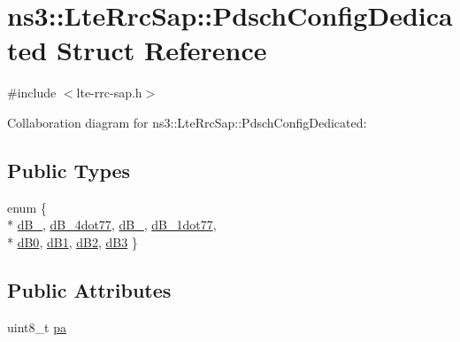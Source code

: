 \hypertarget{structns3_1_1LteRrcSap_1_1PdschConfigDedicated}{}\section{ns3\+:\+:Lte\+Rrc\+Sap\+:\+:Pdsch\+Config\+Dedicated Struct Reference}
\label{structns3_1_1LteRrcSap_1_1PdschConfigDedicated}


{\ttfamily \#include $<$lte-\/rrc-\/sap.\+h$>$}



Collaboration diagram for ns3\+:\+:Lte\+Rrc\+Sap\+:\+:Pdsch\+Config\+Dedicated\+:
\subsection*{Public Types}
\begin{DoxyCompactItemize}
\item 
enum \{ \\*
\hyperlink{structns3_1_1LteRrcSap_1_1PdschConfigDedicated_ab578fcb68059ff534058eb5c67df7168a42399258b8b913f0a56c4e950354cbe3}{d\+B\+\_}, 
\hyperlink{structns3_1_1LteRrcSap_1_1PdschConfigDedicated_ab578fcb68059ff534058eb5c67df7168ad1abcb4b289e226650368e4f93fe1fc8}{d\+B\+\_\+4dot77}, 
\hyperlink{structns3_1_1LteRrcSap_1_1PdschConfigDedicated_ab578fcb68059ff534058eb5c67df7168ad063207223326a9486eba1ce016865d9}{d\+B\+\_}, 
\hyperlink{structns3_1_1LteRrcSap_1_1PdschConfigDedicated_ab578fcb68059ff534058eb5c67df7168a02259942327b99c5664d644aa58232a8}{d\+B\+\_\+1dot77}, 
\\*
\hyperlink{structns3_1_1LteRrcSap_1_1PdschConfigDedicated_ab578fcb68059ff534058eb5c67df7168ab2c88638c7d33e466151e88100a930d6}{d\+B0}, 
\hyperlink{structns3_1_1LteRrcSap_1_1PdschConfigDedicated_ab578fcb68059ff534058eb5c67df7168aa673d34261604d2117b2980842ca4cf4}{d\+B1}, 
\hyperlink{structns3_1_1LteRrcSap_1_1PdschConfigDedicated_ab578fcb68059ff534058eb5c67df7168abb102a537d21d1ba559d2eab80edc657}{d\+B2}, 
\hyperlink{structns3_1_1LteRrcSap_1_1PdschConfigDedicated_ab578fcb68059ff534058eb5c67df7168a72e02fab5b3134438e44150e2cf24c6e}{d\+B3}
 \}
\end{DoxyCompactItemize}
\subsection*{Public Attributes}
\begin{DoxyCompactItemize}
\item 
uint8\+\_\+t \hyperlink{structns3_1_1LteRrcSap_1_1PdschConfigDedicated_aa9b1574a63fb83c53649305ca95aeb31}{pa}
\end{DoxyCompactItemize}


